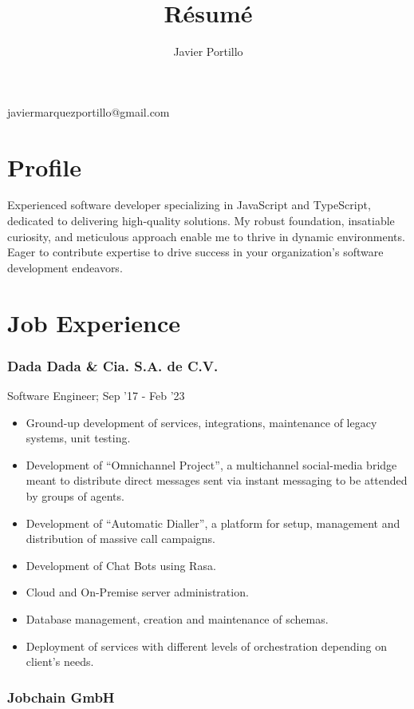 \documentclass[letterpaper]{article}
\makeatletter
\renewcommand{\maketitle}{
	\begin{center}
		{\huge\bfseries\theauthor}

		\vspace{.5em}

		javiermarquezportillo@gmail.com
	\end{center}
}
\makeatother
\begin{document}
\title{R\'esum\'e}
\author{Javier Portillo}

\maketitle

\section{Profile}

Experienced software developer specializing in JavaScript and TypeScript, dedicated to delivering high-quality solutions. My robust foundation, insatiable curiosity, and meticulous approach enable me to thrive in dynamic environments. Eager to contribute expertise to drive success in your organization's software development endeavors.

\section{Job Experience}

\subsubsection{Dada Dada \& Cia. S.A. de C.V.}

Software Engineer; Sep '17 - Feb '23

\begin{itemize}
  \item Ground-up development of services, integrations, maintenance of legacy systems, unit testing.
  \item Development of ``Omnichannel Project'', a multichannel social-media bridge meant to distribute direct messages sent via instant messaging to be attended by groups of agents.
  \item Development of ``Automatic Dialler'', a platform for setup, management and distribution of massive call campaigns.
  \item Development of Chat Bots using Rasa.
  \item Cloud and On-Premise server administration.
  \item Database management, creation and maintenance of schemas.
  \item Deployment of services with different levels of orchestration depending on client's needs.
\end{itemize}

\subsubsection{Jobchain GmbH}
\end{document}
